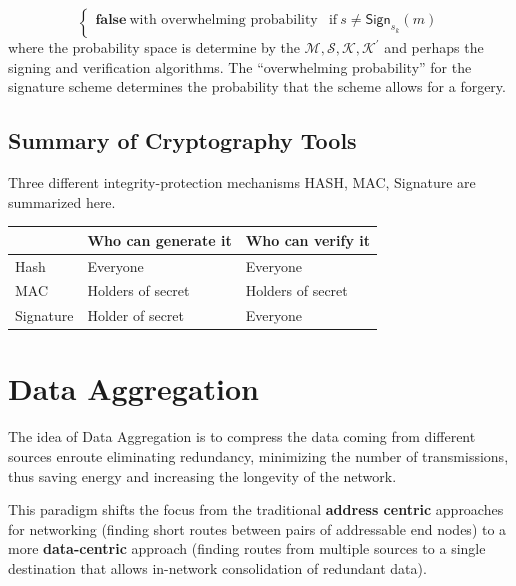 \documentclass[%
  slidesonly,%
  semlayer%
  ]{seminar}                                  %
\begin{document}
\begin{slide}
\begin{equation}
\begin{cases}
       \textbf{false}\ \mbox{with overwhelming probability} & \mbox{if}\ s \neq \textsf{Sign}_{s_{k}}(m)
      \end{cases}
      \label{eq:verification}
    \end{equation}
    where the probability space is determine by the $\mathcal {M, S, K, K^{'}}$ and perhaps the signing and verification algorithms.
    The ``overwhelming probability'' for the signature scheme determines the probability that the scheme allows for a forgery.
    \vfill
    \clearpage

  \subsection*{Summary of Cryptography Tools}
    \vfill
    Three different integrity-protection mechanisms HASH, MAC, Signature are summarized here.
    \begin{table}[!htb]
      \tiny
      \begin{center}
        \begin{tabular}{ |l || l| l| }
          \hline
           & Who can generate it & Who can verify it \\
          \hline
          Hash & Everyone & Everyone \\ 
          \hline
          MAC & Holders of secret & Holders of secret \\
          \hline
          Signature & Holder of secret & Everyone \\
          \hline
        \end{tabular}
      \end{center}
    \end{table}
    \vfill
    \clearpage

\section*{Data Aggregation}
  \vfill
  The idea of Data Aggregation is to compress the data coming from different sources enroute eliminating redundancy, minimizing the number of transmissions, thus saving energy and increasing the longevity of the network.

  This paradigm shifts the focus from the traditional \textbf{address centric} approaches for networking (finding short routes between pairs of addressable end nodes) to a more \textbf{data-centric} approach (finding routes from multiple sources to a single destination that allows in-network consolidation of redundant data).
  \vfill
  \clearpage


\end{slide}
\end{document}
